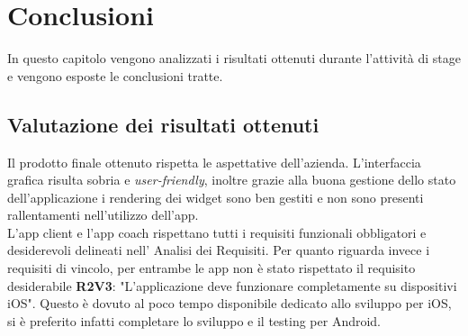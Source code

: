 
\chapter{Conclusioni}
\label{cap:conclusioni}
In questo capitolo vengono analizzati i risultati ottenuti durante l'attività di stage e vengono esposte le conclusioni tratte.
\section{Valutazione dei risultati ottenuti}
Il prodotto finale ottenuto rispetta le aspettative dell'azienda. L'interfaccia grafica risulta sobria e \textit{user-friendly}, inoltre grazie alla buona gestione dello stato dell'applicazione i rendering dei widget sono ben gestiti e non sono presenti rallentamenti nell'utilizzo dell'app.\\
L'app client e l'app coach rispettano tutti i requisiti funzionali obbligatori e desiderevoli delineati nell' Analisi dei Requisiti. Per quanto riguarda invece i requisiti di vincolo, per entrambe le app non è stato rispettato il requisito desiderabile \textbf{R2V3}: "L'applicazione deve funzionare completamente su dispositivi iOS". Questo è dovuto al poco tempo disponibile dedicato allo sviluppo per iOS, si è preferito infatti completare lo sviluppo e il testing per Android.
